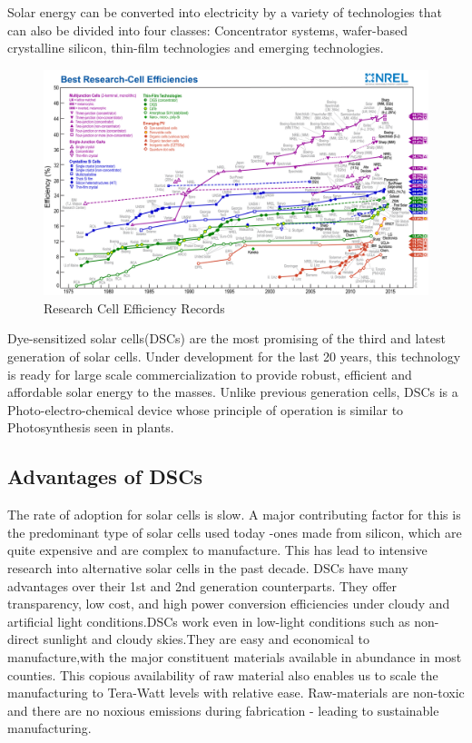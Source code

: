   Solar energy can be converted into electricity by a variety of technologies that can also be divided into four classes: Concentrator systems, wafer-based crystalline silicon, thin-film technologies and emerging technologies\cite{wenger2010strategies}.\\
  
    \begin{figure}[H]
    \begin{center}
    \includegraphics[width=\textwidth]{images/efficiency_chart.jpg}
    \caption{Research Cell Efficiency Records \cite{nrel_Research_Cell} }
    \label{fig:Cell_eficency}
    \end{center}
    \end{figure}
  
  Dye-sensitized solar cells(\ac{DSCs}) are the most promising of the third and latest generation of solar cells. Under development for the last 20 years, this technology is ready for large scale commercialization to provide robust, efficient and affordable solar energy to the masses. Unlike previous generation cells, \ac{DSCs} is a Photo-electro-chemical device whose principle of operation is similar to Photosynthesis seen in plants.\\

 \subsection{Advantages of DSCs }
  
  The rate of adoption for solar cells is slow. A major contributing factor for this is the predominant type of solar cells used today -ones made from silicon, which are quite expensive and are complex to manufacture. This has lead to intensive research into alternative solar cells in the past decade. \ac{DSCs} have many advantages over their 1st and 2nd generation counterparts. They offer transparency, low cost, and high power conversion efficiencies under cloudy and artificial light conditions.\ac{DSCs} work even in low-light conditions such as non-direct sunlight and cloudy skies.They are easy and economical to manufacture,with the major constituent materials available in abundance in most counties. This copious availability of raw material also enables us to scale the manufacturing to Tera-Watt levels with relative ease. Raw-materials are non-toxic and there are no noxious emissions during fabrication - leading to sustainable manufacturing. \\
  
